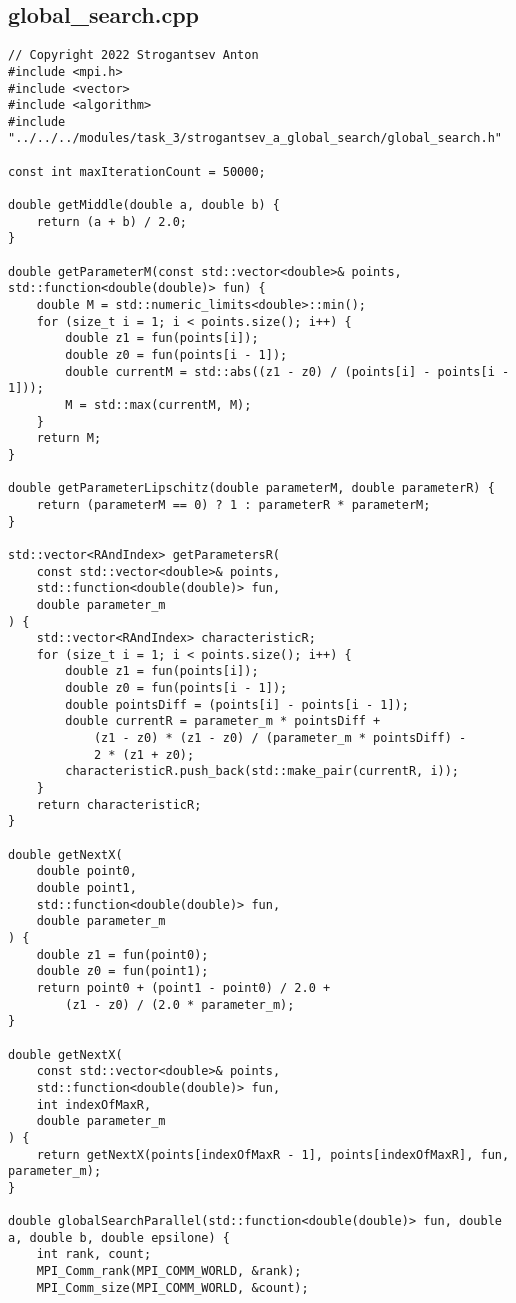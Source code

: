 \documentclass[14pt, a4paper]{extarticle}
\begin{document}
	\subsection{global\_search.cpp}
	\begin{lstlisting}
// Copyright 2022 Strogantsev Anton
#include <mpi.h>
#include <vector>
#include <algorithm>
#include "../../../modules/task_3/strogantsev_a_global_search/global_search.h"

const int maxIterationCount = 50000;

double getMiddle(double a, double b) {
    return (a + b) / 2.0;
}

double getParameterM(const std::vector<double>& points, std::function<double(double)> fun) {
    double M = std::numeric_limits<double>::min();
    for (size_t i = 1; i < points.size(); i++) {
        double z1 = fun(points[i]);
        double z0 = fun(points[i - 1]);
        double currentM = std::abs((z1 - z0) / (points[i] - points[i - 1]));
        M = std::max(currentM, M);
    }
    return M;
}

double getParameterLipschitz(double parameterM, double parameterR) {
    return (parameterM == 0) ? 1 : parameterR * parameterM;
}

std::vector<RAndIndex> getParametersR(
    const std::vector<double>& points,
    std::function<double(double)> fun,
    double parameter_m
) {
    std::vector<RAndIndex> characteristicR;
    for (size_t i = 1; i < points.size(); i++) {
        double z1 = fun(points[i]);
        double z0 = fun(points[i - 1]);
        double pointsDiff = (points[i] - points[i - 1]);
        double currentR = parameter_m * pointsDiff +
            (z1 - z0) * (z1 - z0) / (parameter_m * pointsDiff) -
            2 * (z1 + z0);
        characteristicR.push_back(std::make_pair(currentR, i));
    }
    return characteristicR;
}

double getNextX(
    double point0,
    double point1,
    std::function<double(double)> fun,
    double parameter_m
) {
    double z1 = fun(point0);
    double z0 = fun(point1);
    return point0 + (point1 - point0) / 2.0 +
        (z1 - z0) / (2.0 * parameter_m);
}

double getNextX(
    const std::vector<double>& points,
    std::function<double(double)> fun,
    int indexOfMaxR,
    double parameter_m
) {
    return getNextX(points[indexOfMaxR - 1], points[indexOfMaxR], fun, parameter_m);
}

double globalSearchParallel(std::function<double(double)> fun, double a, double b, double epsilone) {
    int rank, count;
    MPI_Comm_rank(MPI_COMM_WORLD, &rank);
    MPI_Comm_size(MPI_COMM_WORLD, &count);


\end{lstlisting}
\end{document}
